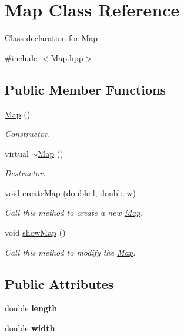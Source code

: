 \hypertarget{class_map}{}\section{Map Class Reference}
\label{class_map}


Class declaration for \mbox{\hyperlink{class_map}{Map}}.  




{\ttfamily \#include $<$Map.\+hpp$>$}

\subsection*{Public Member Functions}
\begin{DoxyCompactItemize}
\item 
\mbox{\label{class_map_a0f5ad0fd4563497b4214038cbca8b582}} 
\mbox{\hyperlink{class_map_a0f5ad0fd4563497b4214038cbca8b582}{Map}} ()
\begin{DoxyCompactList}\small\item\em Constructor. \end{DoxyCompactList}\item 
\mbox{\label{class_map_aa403fbe09394ccf39747588f5168e3b2}} 
virtual \mbox{\hyperlink{class_map_aa403fbe09394ccf39747588f5168e3b2}{$\sim$\+Map}} ()
\begin{DoxyCompactList}\small\item\em Destructor. \end{DoxyCompactList}\item 
void \mbox{\hyperlink{class_map_ac10743acc7daf1dd4cc3746fca767554}{create\+Map}} (double l, double w)
\begin{DoxyCompactList}\small\item\em Call this method to create a new \mbox{\hyperlink{class_map}{Map}}. \end{DoxyCompactList}\item 
void \mbox{\hyperlink{class_map_a36679bcc048d59f8e2b8ccc81598200c}{show\+Map}} ()
\begin{DoxyCompactList}\small\item\em Call this method to modify the \mbox{\hyperlink{class_map}{Map}}. \end{DoxyCompactList}\end{DoxyCompactItemize}
\subsection*{Public Attributes}
\begin{DoxyCompactItemize}
\item 
\mbox{\label{class_map_ab0dd5c291b9ed9a13459d178da9b53e9}} 
double {\bfseries length}
\item 
\mbox{\label{class_map_ab46c7052931169c634ce4ba574471053}} 
double {\bfseries width}
\end{DoxyCompactItemize}


